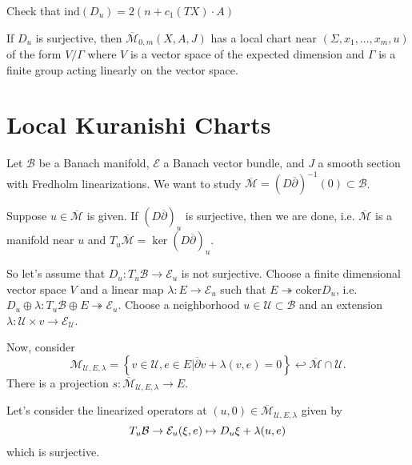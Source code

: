 \begin{exercise}

Check that $\text{ind}(D_u)=2(n+c_1(TX)\cdot A)$

\end{exercise}

\begin{theorem}

If $D_u$ is surjective, then $\overline{\mathcal{M}}_{0,m}(X,A,J)$ has a local chart near $(\Sigma,x_1,...,x_m, u)$ of the form $V/\Gamma$ where $V$ is a vector space of the expected dimension and $\Gamma$ is a finite group acting linearly on the vector space.

\end{theorem}

\section{Local Kuranishi Charts}

Let $\mathcal{B}$ be a Banach manifold, $\mathcal{E}$ a Banach vector bundle, and $J$ a smooth section with Fredholm linearizations. We want to study $\overline{\mathcal{M}} = \left(D \overline{\partial}\right)^{-1}(0)\subset \mathcal{B}$.

Suppose $u\in \overline{\mathcal{M}}$ is given. If $\left(D \overline{\partial}\right)_u$ is surjective, then we are done, i.e. $\overline{\mathcal{M}}$ is a manifold near $u$ and $T_u \overline{\mathcal{M}}=\ker \left(D \overline{\partial}\right)_u$.

So let's assume that $D_u: T_u \mathcal{B}\to \mathcal{E}_u$ is not surjective. Choose a finite dimensional vector space $V$ and a linear map $\lambda: E \to \mathcal{E}_u$ such that $E\twoheadrightarrow \text{coker}D_u$, i.e. $D_u \oplus \lambda: T_u \mathcal{B} \oplus E \twoheadrightarrow \mathcal{E}_u$. Choose a neighborhood $u\in \mathcal{U} \subset \mathcal{B}$ and an extension $\lambda: \mathcal{U}\times v \to \mathcal{E}_{\mathcal{U}}$.

Now, consider
\[
\mathcal{M}_{\mathcal{U}, E, \lambda} = \left\{ v\in \mathcal{U}, e\in E | \overline{\partial}v+\lambda(v,e) =0 \right \} \hookleftarrow  \overline{\mathcal{M}}\cap \mathcal{U}.
\]
There is a projection $s: \overline{\mathcal{M}}_{\mathcal{U}, E, \lambda}\to E$.

Let's consider the linearized operators at $(u,0) \in \overline{\mathcal{M}}_{\mathcal{U}, E, \lambda}$ given by
\[
T_u \mathcal{B} \to \mathcal{E}_u \\
(\xi, e)\mapsto D_u \xi + \lambda(u,e)
\]
which is surjective.

